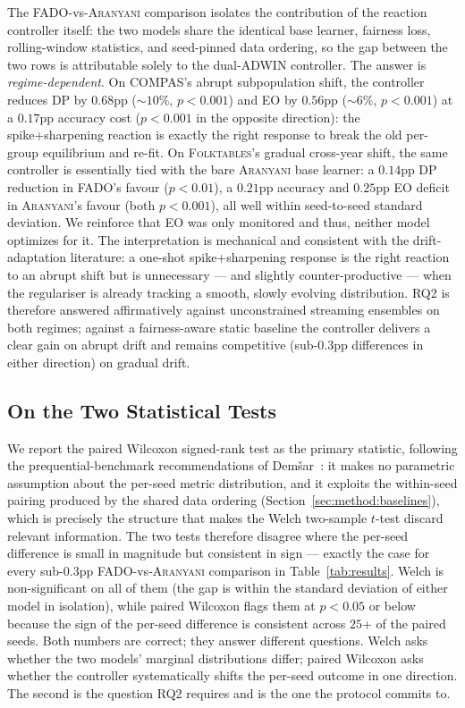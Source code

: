 \documentclass[sigconf,anonymous,review]{acmart}
\begin{document}
The \textsc{FADO}-vs-\textsc{Aranyani} comparison isolates the contribution of the reaction controller itself: the two models share the identical base
learner, fairness loss, rolling-window statistics, and seed-pinned data ordering, so the gap between the two rows is attributable solely to the
dual-ADWIN controller. The answer is \emph{regime-dependent}. On \textsc{COMPAS}'s abrupt subpopulation shift, the controller reduces DP by $0.68$pp
($\sim 10\%$, $p<0.001$) and EO by $0.56$pp ($\sim 6\%$, $p<0.001$) at a $0.17$pp accuracy cost ($p<0.001$ in the opposite direction): the spike+sharpening
reaction is exactly the right response to break the old per-group equilibrium and re-fit. On \textsc{Folktables}'s gradual cross-year shift, the same
controller is essentially tied with the bare \textsc{Aranyani} base learner: a $0.14$pp DP reduction in \textsc{FADO}'s favour ($p<0.01$), a $0.21$pp
accuracy and $0.25$pp EO deficit in \textsc{Aranyani}'s favour (both $p<0.001$), all well within seed-to-seed standard deviation. We
reinforce that EO was only monitored and thus, neither model optimizes for it. The
interpretation is mechanical and consistent with the drift-adaptation literature: a one-shot spike+sharpening response is the right reaction to an abrupt
shift but is unnecessary --- and slightly counter-productive --- when the regulariser is already tracking a smooth, slowly evolving distribution. RQ2 is
therefore answered affirmatively against unconstrained streaming ensembles on both regimes; against a fairness-aware static baseline the controller
delivers a clear gain on abrupt drift and remains competitive (sub-$0.3$pp differences in either direction) on gradual drift.

\subsection{On the Two Statistical Tests}
\label{sec:results:tests}
We report the paired Wilcoxon signed-rank test as the primary statistic, following the prequential-benchmark recommendations of
Dem\v{s}ar~\cite{demsar2006statistical}: it makes no parametric assumption about the per-seed metric distribution, and it exploits the within-seed pairing
produced by the shared data ordering (Section~\ref{sec:method:baselines}), which is precisely the structure that makes the Welch two-sample $t$-test
discard relevant information. The two tests therefore disagree where the per-seed difference is small in magnitude but consistent in sign --- exactly the
case for every sub-$0.3$pp \textsc{FADO}-vs-\textsc{Aranyani} comparison in Table~\ref{tab:results}. Welch is non-significant on all of them (the gap is
within the standard deviation of either model in isolation), while paired Wilcoxon flags them at $p<0.05$ or below because the sign of the per-seed
difference is consistent across $25$+ of the paired seeds. Both numbers are correct; they answer different questions. Welch asks whether the two models'
marginal distributions differ; paired Wilcoxon asks whether the controller systematically shifts the per-seed outcome in one direction. The second is the
question RQ2 requires and is the one the protocol commits to.
\end{document}
